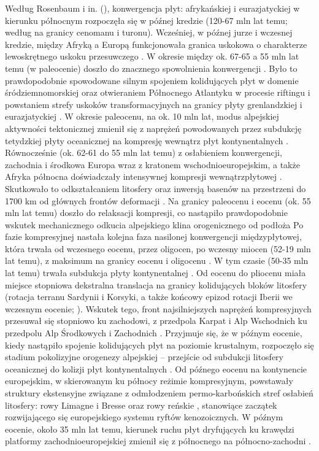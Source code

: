 \documentclass[11.5pt,twoside]{report}
\begin{document}
Według Rosenbaum i in. (\citeyear{Rosenbaum.2002}), konwergencja płyt: afrykańskiej i eurazjatyckiej w kierunku północnym rozpoczęła się w pó\'{z}nej kredzie (120-67 mln lat temu; według \cite{Dewey.1989} na granicy cenomanu i turonu). Wcześniej, w pó\'{z}nej jurze i wczesnej kredzie, między Afryką a Europą funkcjonowała granica uskokowa o charakterze lewoskrętnego uskoku przesuwczego \parencite{Rosenbaum.2002,Dewey.1989}. W okresie między ok. 67-65 a 55 mln lat temu (w paleocenie) doszło do znacznego spowolnienia konwergencji \parencite{Rosenbaum.2002}. Było to prawdopodobnie spowodowane silnym spojeniem kolidujących płyt w domenie śródziemnomorskiej \parencite{Dezes.2004} oraz otwieraniem Północnego Atlantyku w procesie riftingu i powstaniem strefy uskoków transformacyjnych na granicy płyty grenlandzkiej i eurazjatyckiej \parencite{Nielsen.2007,Sissingh.2006a,Dewey.1989}. W okresie paleocenu, na ok. 10 mln lat, modus alpejskiej aktywności tektonicznej zmienił się z naprężeń powodowanych przez subdukcję tetydzkiej płyty oceanicznej na kompresję wewnątrz płyt kontynentalnych \parencite{Nielsen.2007,Sissingh.2006a}. Równocześnie (ok. 62-61 do 55 mln lat temu) z osłabieniem konwergencji, zachodnia i środkowa Europa wraz z kratonem wschodnioeuropejskim, a także Afryka północna doświadczały intensywnej kompresji wewnątrzpłytowej \parencite{Nielsen.2007,Dezes.2004}. Skutkowało to odkształcaniem litosfery oraz inwersją basenów na przestrzeni do 1700 km od głównych frontów deformacji \parencite{Dezes.2004}. Na granicy paleocenu i eocenu (ok. 55 mln lat temu) doszło do relaksacji kompresji, co nastąpiło prawdopodobnie wskutek mechanicznego odkucia alpejskiego klina orogenicznego od podłoża Po fazie kompresyjnej nastała kolejna faza nasilonej konwergencji międzypłytowej, która trwała od wczesnego eocenu, przez oligocen, po wczesny miocen (52-19 mln lat temu), z maksimum na granicy eocenu i oligocenu \parencite{Rosenbaum.2002}. W tym czasie (50-35 mln lat temu) trwała subdukcja płyty kontynentalnej \parencite{Carry.2009}. Od eocenu do pliocenu miała miejsce stopniowa dekstralna translacja na granicy kolidujących bloków litosfery (rotacja terranu Sardynii i Korsyki, a także końcowy epizod rotacji Iberii we wczesnym eocenie; \cite{Advokaat.2014,Rosenbaum.2002,Dewey.1989}). Wskutek tego, front najsilniejszych naprężeń kompresyjnych przesuwał się stopniowo ku zachodowi, z przedpola Karpat i Alp Wschodnich ku przedpolu Alp Środkowych i Zachodnich \parencite{Wilson.2006}. Przyjmuje się, że w pó\'{z}nym eocenie, kiedy nastąpiło spojenie kolidujących płyt na poziomie krustalnym, rozpoczęło się stadium pokolizyjne orogenezy alpejskiej -- przejście od subdukcji litosfery oceanicznej do kolizji płyt kontynentalnych \parencite{Sissingh.2006a}. Od pó\'{z}nego eocenu na kontynencie europejskim, w skierowanym ku północy reżimie kompresyjnym, powstawały struktury ekstensyjne związane z odmłodzeniem permo-karbońskich stref osłabień litosfery: rowy Limagne i Bresse oraz rowy reńskie \parencite{Wilson.2006}, stanowiące zaczątek rozwijającego się europejskiego systemu ryftów kenozoicznych. W pó\'{z}nym eocenie, około 35 mln lat temu, kierunek ruchu płyt dryfujących ku krawędzi platformy zachodnioeuropejskiej zmienił się z północnego na północno-zachodni \parencite{Wilson.2006,Sissingh.2006a,Dewey.1989}. 
\end{document}
